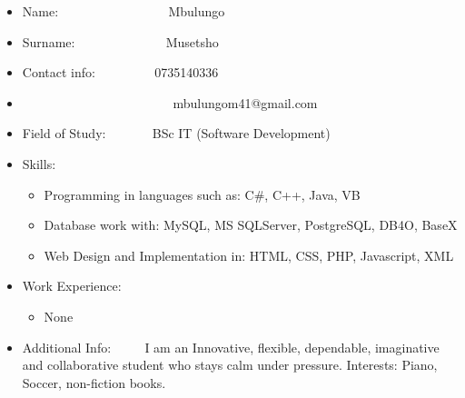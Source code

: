 \documentclass[12pt]{article}
\begin{document}
\begin{itemize}
\item Name: \ ~~~~~~~~~~~~~~ \ Mbulungo
\item Surname: \ ~~~~~~~~~~~ \ Musetsho
\item Contact info: \ ~~~~~~ \ 0735140336
\item \ ~~~~~~~~~~~~~~~~~~~~~ \ mbulungom41@gmail.com
\item Field of Study: \ ~~~~ \ BSc IT (Software Development)
\item Skills: 	\begin{itemize}
					\item Programming in languages such as: C\#, C++, Java, VB
					\item Database work with: MySQL, MS SQLServer, PostgreSQL, DB4O, BaseX
					\item Web Design and Implementation in: HTML, CSS, PHP, Javascript, XML
				\end{itemize}
\item Work Experience: 	\begin{itemize}
							\item None
						\end{itemize}
\item Additional Info: \ ~~ \ I am an Innovative,  flexible, dependable, imaginative and collaborative student who stays calm under pressure. Interests: Piano, Soccer, non-fiction books.
\end{itemize}
\end{document}
